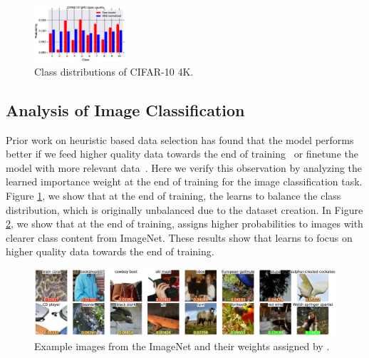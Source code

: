 
\begin{figure}
  \vspace{-10mm}
  \begin{center}
    \includegraphics[width=0.3\textwidth]{figs/cifar10_dds.eps}
  \end{center}
  \vspace{-4mm}
  \caption{\label{fig:dds_distribution}Class distributions of CIFAR-10 4K.}
  \vspace{-8mm}
\end{figure}

\subsection{Analysis of Image Classification}
 Prior work on heuristic based data selection has found that the model performs better if we feed higher quality data towards the end of training~\citep{dynamic_data_selection_nmt} or finetune the model with more relevant data~\citep{dynamic}. Here we verify this observation by analyzing the learned importance weight at the end of training for the image classification task. Figure \ref{fig:dds_distribution}, we show that at the end of training, the \dds learns to balance the class distribution, which is originally unbalanced due to the dataset creation. In Figure \ref{fig:dds_score}, we show that at the end of training, \dds assigns higher probabilities to images with clearer class content from ImageNet. These results show that \dds learns to focus on higher quality data towards the end of training.  

\begin{figure}
    \centering
    \includegraphics[width=\textwidth]{figs/imagenet_dds.eps}
  \caption{\label{fig:dds_score} Example images from the ImageNet and their weights assigned by \dds. }
\end{figure}

